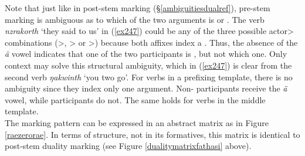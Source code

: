 Note that just like in post-stem  marking (\S{}\ref{ambiguitiesdualref}), pre-stem  marking is ambiguous as to which of the two arguments is  or . The verb \emph{nzrakorth} `they said to us' in (\ref{ex247}) could be any of the three possible actor> combinations (\Pl>\Du, \Du>\Du{} or \Du>\Pl) because both  affixes index a  . Thus, the absence of the \emph{ä} vowel indicates that one of the two participants is , but not which one. Only context may solve this structural ambiguity, which in (\ref{ex247}) is clear from the second verb \emph{ŋakwinth} `you two go'. For verbs in a prefixing template, there is no ambiguity since they index only one argument. Non- participants receive the \emph{ä} vowel, while  participants do not. The same holds for verbs in the middle template.\\

The marking pattern can be expressed in an abstract matrix as in Figure \ref{raezerorae}. In terms of structure, not in its formatives, this matrix is identical to post-stem duality marking (see Figure \ref{dualitymatrixfathasi} above).

